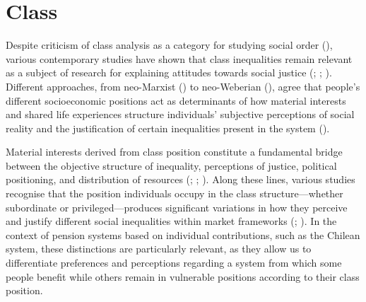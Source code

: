 \documentclass[
  12pt,
]{article}
\begin{document}
\section{Class}\label{class}

Despite criticism of class analysis as a category for studying social
order (),
various contemporary studies have shown that class inequalities remain
relevant as a subject of research for explaining attitudes towards
social justice (;
;
).
Different approaches, from neo-Marxist
() to neo-Weberian
(), agree that
people's different socioeconomic positions act as determinants of how
material interests and shared life experiences structure individuals'
subjective perceptions of social reality and the justification of
certain inequalities present in the system
().

Material interests derived from class position constitute a fundamental
bridge between the objective structure of inequality, perceptions of
justice, political positioning, and distribution of resources
(;
;
).
Along these lines, various studies recognise that the position
individuals occupy in the class structure---whether subordinate or
privileged---produces significant variations in how they perceive and
justify different social inequalities within market frameworks
(;
). In the context of
pension systems based on individual contributions, such as the Chilean
system, these distinctions are particularly relevant, as they allow us
to differentiate preferences and perceptions regarding a system from
which some people benefit while others remain in vulnerable positions
according to their class position.
\end{document}
